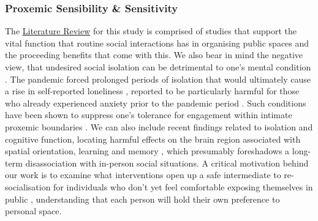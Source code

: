 \subsubsection{Proxemic Sensibility \& Sensitivity}
\label{subsec:sensibility}
The \hyperref[sec2:Background]{Literature Review} for this study is comprised of studies that support the vital function that routine social interactions has in organising public spaces and the proceeding benefits that come with this. We also bear in mind the negative view, that undesired social isolation can be detrimental to one's mental condition \citep{evans_social_2019,zorzo_adult_2019,mumtaz_neurobiology_2018}. The pandemic forced prolonged periods of isolation that would ultimately cause a rise in self-reported loneliness \citep{forte_covid-19_2020}, reported to be particularly harmful for those who already experienced anxiety prior to the pandemic period \citep{liang_post-traumatic_2020,brooks_psychological_2020}. Such conditions have been shown to suppress one's tolerance for engagement within intimate proxemic boundaries \citep{layden_loneliness_2018}. We can also include recent findings related to isolation and cognitive function, locating harmful effects on the brain region associated with spatial orientation, learning and memory \citep{rivera_effects_2020,ritchie_cognitive_2020}, which presumably foreshadows a long-term disassociation with in-person social situations. A critical motivation behind our work is to examine what interventions open up a safe intermediate to re-socialisation for individuals who don't yet feel comfortable exposing themselves in public \citep{lupton_coping_2022}, understanding that each person will hold their own preference to personal space.

